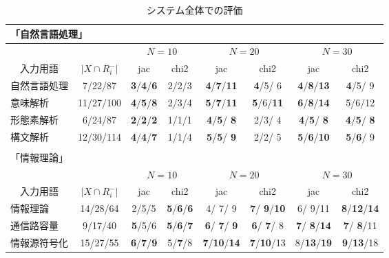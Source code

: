 \begin{table}
 \begin{center}\scriptsize
  \caption{システム全体での評価}\label{tbl:total_result}
  \begin{tabular}{|l|c||cc|cc|cc|}
   \multicolumn{8}{l}{「自然言語処理」 }\\
   \hline
   \multicolumn{2}{|c||}{} &
   \multicolumn{2}{c}{$N=10$} & 
   \multicolumn{2}{|c}{$N=20$} &
   \multicolumn{2}{|c|}{$N=30$} \\
   \multicolumn{1}{|c}{入力用語} & 
   \multicolumn{1}{c||}{$|X\cap R_i^{-}|$} &
   \multicolumn{1}{c}{jac} &
   \multicolumn{1}{c}{chi2} &
   \multicolumn{1}{|c}{jac} &
   \multicolumn{1}{c}{chi2} &
   \multicolumn{1}{|c}{jac} &
   \multicolumn{1}{c|}{chi2} \\
   \hline
   自然言語処理 &7/22/87&{\bf 3}/{\bf 4}/{\bf 6}&2/2/3&{\bf 4}/{\bf 7}/{\bf 11}&{\bf 4}/5/ 6&{\bf 4}/{\bf 8}/{\bf 13}&{\bf 4}/5/ 9 \\ 
   意味解析 &11/27/100&{\bf 4}/{\bf 5}/{\bf 8}&2/3/4&{\bf 5}/{\bf 7}/{\bf 11}&{\bf 5}/6/{\bf 11}&{\bf 6}/{\bf 8}/{\bf 14}&5/6/12 \\ 
   形態素解析 &6/24/87&{\bf 2}/{\bf 2}/{\bf 2}&1/1/1&{\bf 4}/{\bf 5}/ {\bf 8}&2/3/ 4&{\bf 4}/{\bf 5}/ {\bf 8}&{\bf 4}/{\bf 5}/ {\bf 8} \\ 
   構文解析 &12/30/114&{\bf 4}/{\bf 4}/{\bf 7}&1/1/4&{\bf 5}/{\bf 5}/ {\bf 9}&2/2/ 5&{\bf 5}/{\bf 6}/{\bf 10}&{\bf 5}/{\bf 6}/ 9 \\ 
   \hline
   \multicolumn{8}{c}{\tiny }\\[-5pt]
   \multicolumn{8}{l}{「情報理論」 }\\
   \hline
   \multicolumn{2}{|c||}{} &
   \multicolumn{2}{c}{$N=10$} & 
   \multicolumn{2}{|c}{$N=20$} &
   \multicolumn{2}{|c|}{$N=30$} \\
   \multicolumn{1}{|c}{入力用語} & 
   \multicolumn{1}{c||}{$|X\cap R_i^{-}|$} &
   \multicolumn{1}{c}{jac} &
   \multicolumn{1}{c}{chi2} &
   \multicolumn{1}{|c}{jac} &
   \multicolumn{1}{c}{chi2} &
   \multicolumn{1}{|c}{jac} &
   \multicolumn{1}{c|}{chi2} \\
   \hline
   情報理論 & 14/28/64 & 2/5/5 & {\bf 5}/{\bf 6}/{\bf 6} & 4/ 7/ 9 & {\bf 7}/ {\bf 9}/{\bf 10} & 6/ 9/11 & {\bf 8}/{\bf 12}/{\bf 14} \\ 
   通信路容量 & 9/17/40 & {\bf 5}/5/6 & {\bf 5}/{\bf 6}/{\bf 7} & {\bf 6}/ {\bf 7}/ {\bf 9} & {\bf 6}/ {\bf 7}/ 8 & {\bf 7}/ {\bf 8}/{\bf 14} & {\bf 7}/ {\bf 8}/11 \\ 
   情報源符号化 & 15/27/55 & {\bf 6}/{\bf 7}/{\bf 9} & 5/{\bf 7}/8 & {\bf 7}/{\bf 10}/{\bf 14} & {\bf 7}/{\bf 10}/13 & 8/{\bf 13}/{\bf 19} & {\bf 9}/{\bf 13}/18 \\ 

\end{tabular}
\end{center}
\end{table}
